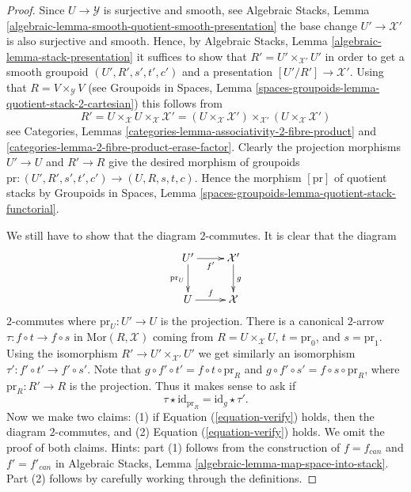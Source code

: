 \begin{proof}
Since $U \to \mathcal{Y}$ is surjective and smooth, see
Algebraic Stacks,
Lemma \ref{algebraic-lemma-smooth-quotient-smooth-presentation}
the base change $U' \to \mathcal{X}'$ is also surjective and smooth.
Hence, by
Algebraic Stacks,
Lemma \ref{algebraic-lemma-stack-presentation}
it suffices to show that $R' = U' \times_{\mathcal{X}'} U'$ in order to
get a smooth groupoid $(U', R', s', t', c')$ and a presentation
$[U'/R'] \to \mathcal{X}'$.
Using that $R = V \times_{\mathcal{Y}} V$ (see
Groupoids in Spaces,
Lemma \ref{spaces-groupoids-lemma-quotient-stack-2-cartesian})
this follows from
$$
R' =
U \times_{\mathcal{X}} U \times_{\mathcal{X}} \mathcal{X}' =
(U \times_{\mathcal{X}} \mathcal{X}')
\times_{\mathcal{X}'}
(U \times_{\mathcal{X}} \mathcal{X}')
$$
see
Categories, Lemmas \ref{categories-lemma-associativity-2-fibre-product} and
\ref{categories-lemma-2-fibre-product-erase-factor}.
Clearly the projection morphisms $U' \to U$ and $R' \to R$ give the
desired morphism of groupoids
$\text{pr} : (U', R', s', t', c') \to (U, R, s, t, c)$.
Hence the morphism $[\text{pr}]$ of quotient stacks by
Groupoids in Spaces,
Lemma \ref{spaces-groupoids-lemma-quotient-stack-functorial}.

\medskip\noindent
We still have to show that the diagram $2$-commutes.
It is clear that the diagram
$$
\xymatrix{
U' \ar[d]_{\text{pr}_U} \ar[r]_{f'} & \mathcal{X}' \ar[d]^g \\
U \ar[r]^f & \mathcal{X}
}
$$
$2$-commutes where $\text{pr}_U : U' \to U$ is the projection.
There is a canonical $2$-arrow
$\tau : f \circ t \to f \circ s$ in $\text{Mor}(R, \mathcal{X})$
coming from $R = U \times_{\mathcal{X}} U$, $t = \text{pr}_0$, and
$s = \text{pr}_1$. Using the isomorphism
$R' \to U' \times_{\mathcal{X}'} U'$ we get similarly an isomorphism
$\tau' : f' \circ t' \to f' \circ s'$. Note that
$g \circ f' \circ t' = f \circ t \circ \text{pr}_R$ and
$g \circ f' \circ s' = f \circ s \circ \text{pr}_R$, where
$\text{pr}_R : R' \to R$ is the projection. Thus it makes sense to ask
if
\begin{equation}
\label{equation-verify}
\tau \star \text{id}_{\text{pr}_R} = \text{id}_g \star \tau'.
\end{equation}
Now we make two claims: (1) if Equation (\ref{equation-verify}) holds,
then the diagram $2$-commutes, and (2) Equation (\ref{equation-verify}) holds.
We omit the proof of both claims. Hints: part (1) follows from the
construction of $f = f_{can}$ and $f' = f'_{can}$ in
Algebraic Stacks, Lemma \ref{algebraic-lemma-map-space-into-stack}.
Part (2) follows by carefully working through the definitions.
\end{proof}

